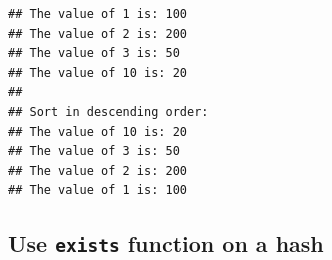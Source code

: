 \documentclass[]{book}
\makeatletter
\newenvironment{Shaded}{\begin{snugshade}}{\end{snugshade}}
\newcommand{\CharTok}[1]{\textcolor[rgb]{0.31,0.60,0.02}{#1}}
\newcommand{\CommentTok}[1]{\textcolor[rgb]{0.56,0.35,0.01}{\textit{#1}}}
\newcommand{\DataTypeTok}[1]{\textcolor[rgb]{0.13,0.29,0.53}{#1}}
\newcommand{\FunctionTok}[1]{\textcolor[rgb]{0.00,0.00,0.00}{#1}}
\newcommand{\KeywordTok}[1]{\textcolor[rgb]{0.13,0.29,0.53}{\textbf{#1}}}
\newcommand{\NormalTok}[1]{#1}
\newcommand{\StringTok}[1]{\textcolor[rgb]{0.31,0.60,0.02}{#1}}
\newenvironment{kframe}{%
\medskip{}
\setlength{\fboxsep}{.8em}
 \def\at@end@of@kframe{}%
 \ifinner\ifhmode%
  \def\at@end@of@kframe{\end{minipage}}%
  \begin{minipage}{\columnwidth}%
 \fi\fi%
 \def\FrameCommand##1{\hskip\@totalleftmargin \hskip-\fboxsep
 \colorbox{shadecolor}{##1}\hskip-\fboxsep
     \hskip-\linewidth \hskip-\@totalleftmargin \hskip\columnwidth}%
 \MakeFramed {\advance\hsize-\width
   \@totalleftmargin\z@ \linewidth\hsize
   \@setminipage}}%
 {\par\unskip\endMakeFramed%
 \at@end@of@kframe}
\renewenvironment{Shaded}{\begin{kframe}}{\end{kframe}}
\makeatother
\begin{document}
\begin{Shaded}
\end{Shaded}

\begin{verbatim}
## The value of 1 is: 100
## The value of 2 is: 200
## The value of 3 is: 50
## The value of 10 is: 20
## 
## Sort in descending order: 
## The value of 10 is: 20
## The value of 3 is: 50
## The value of 2 is: 200
## The value of 1 is: 100
\end{verbatim}

\hypertarget{use-exists-function-on-a-hash}{%
\subsection{\texorpdfstring{Use \texttt{exists} function on a hash}{Use exists function on a hash}}\label{use-exists-function-on-a-hash}}
\end{document}
